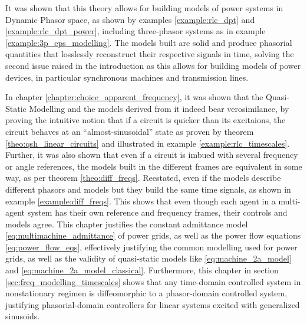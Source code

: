 	It was shown that this theory allows for building models of power systems in Dynamic Phasor space, as shown by examples \ref{example:rlc_dpt} and \ref{example:rlc_dpt_power}, including three-phasor systems as in example \ref{example:3p_eps_modelling}. The models built are solid and produce phasorial quantities that losslessly reconstruct their respective signals in time, solving the second issue raised in the introduction as this allows for building models of power devices, in particular synchronous machines and transmission lines.

	In chapter \ref{chapter:choice_apparent_frequency}, it was shown that the Quasi-Static Modelling and the models derived from it indeed bear verosimilance, by proving the intuitive notion that if a circuit is quicker than its excitaions, the circuit behaves at an ``almost-sinusoidal'' state as proven by theorem \ref{theo:qsh_linear_circuits} and illustrated in example \ref{example:rlc_timescales}. Further, it was also shown that even if a circuit is imbued with several frequency or angle references, the models built in the different frames are equivalent in some way, as per theorem \ref{theo:diff_freqs}. Reestated, even if the models describe different phasors and models but they build the same time signals, as shown in example \ref{example:diff_freqs}. This shows that even though each agent in a multi-agent system has their own reference and frequency frames, their controls and models agree. This chapter justifies the constant admittance model \eqref{eq:multimachine_admittance} of power grids, as well as the power flow equations \eqref{eq:power_flow_eqs}, effectively justifying the common modelling used for power grids, as well as the validity of quasi-static models like \eqref{eq:machine_2a_model} and \eqref{eq:machine_2a_model_classical}. Furthermore, this chapter in section \ref{sec:freq_modelling_timescales} shows that any time-domain controlled system in nonstationary regimen is diffeomorphic to a phasor-domain controlled system, justifying phasorial-domain controllers for linear systems excited with generalized sinusoids.

